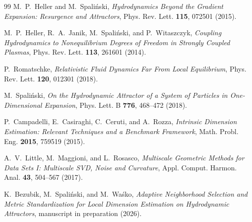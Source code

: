 \documentclass[11pt,a4paper]{article}
\begin{document}
\begin{thebibliography}{99}
M.~P.~Heller and M.~Spali\'nski,
\emph{Hydrodynamics Beyond the Gradient Expansion: Resurgence and Attractors},
Phys. Rev. Lett. \textbf{115}, 072501 (2015).

M.~P.~Heller, R.~A.~Janik, M.~Spali\'nski, and P.~Witaszczyk,
\emph{Coupling Hydrodynamics to Nonequilibrium Degrees of Freedom in Strongly Coupled Plasmas},
Phys. Rev. Lett. \textbf{113}, 261601 (2014).

P.~Romatschke,
\emph{Relativistic Fluid Dynamics Far From Local Equilibrium},
Phys. Rev. Lett. \textbf{120}, 012301 (2018).

M.~Spali\'nski,
\emph{On the Hydrodynamic Attractor of a System of Particles in One-Dimensional Expansion},
Phys. Lett. B \textbf{776}, 468--472 (2018).

P.~Campadelli, E.~Casiraghi, C.~Ceruti, and A.~Rozza,
\emph{Intrinsic Dimension Estimation: Relevant Techniques and a Benchmark Framework},
Math. Probl. Eng. \textbf{2015}, 759519 (2015).

A.~V.~Little, M.~Maggioni, and L.~Rosasco,
\emph{Multiscale Geometric Methods for Data Sets I: Multiscale SVD, Noise and Curvature},
Appl. Comput. Harmon. Anal. \textbf{43}, 504--567 (2017).

K.~Bezubik, M.~Spali\'nski, and M.~Wa\'sko,
\emph{Adaptive Neighborhood Selection and Metric Standardization for Local Dimension Estimation on Hydrodynamic Attractors},
manuscript in preparation (2026).
\end{thebibliography}
\end{document}
